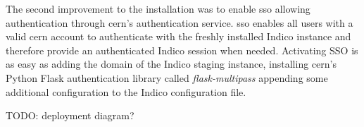 The second improvement to the installation was to enable \gls{sso} allowing authentication through \gls{cern}'s authentication service. \gls{sso} enables all users with a valid \gls{cern} account to authenticate with the freshly installed Indico instance and therefore provide an authenticated Indico session when needed. Activating SSO is as easy as adding the domain of the Indico staging instance, installing \gls{cern}'s Python Flask authentication library called \textit{flask-multipass} \cite{flask-multipass} appending some additional configuration to the Indico configuration file.

TODO: deployment diagram?